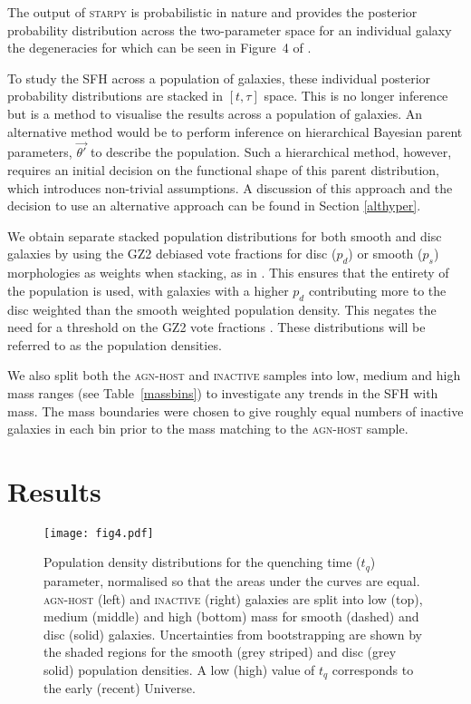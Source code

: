 \documentclass[useAMS,usenatbib]{mn2e}
\def\changed    {\color{nc} }
\def\changedbds    {\color{ncc} }
\def\secondchange    {\color{srv} }
\def\newref    {\color{new} }
\def\starpy ~{\textsc{starpy}}
\begin{document}
The output of \starpy  ~ is probabilistic in nature and provides the posterior probability distribution across the two-parameter space for an individual galaxy {\newref the degeneracies for which can be seen in Figure~4 of \citealt{Sme2015}}. {\changed To study the SFH across a population of galaxies, these individual posterior probability distributions are {\secondchange stacked in $[t, \tau]$ space. This is no longer inference but is a method to visualise the results across a population of galaxies. An alternative method would be to perform inference on hierarchical Bayesian parent parameters, $\vec{\theta'}$ to describe the population. Such a hierarchical method, however, requires an initial decision on the functional shape of this parent distribution, which introduces non-trivial assumptions. A discussion of this approach and the decision to use an alternative approach can be found in Section \ref{althyper}.}

We obtain separate stacked population distributions for both smooth and disc galaxies by using the GZ2 debiased vote fractions for disc ($p_d$) or smooth ($p_s$) morphologies as weights when stacking, as in \citet{Sme2015}. This ensures that the entirety of the population is used, with galaxies with a higher $p_d$ contributing more to the disc weighted than the smooth weighted population density. This negates the need for a threshold on the GZ2 vote fractions \citep[e.g., $p_d > 0.8$ as used in][]{Sch2014}. {\secondchange These distributions will be referred to as the population densities.}}


We also split both the \textsc{agn-host} and \textsc{inactive} samples into low, medium and high mass ranges (see Table~\ref{massbins}) to investigate any trends in the SFH with mass. {\changed The mass boundaries were chosen to give roughly equal numbers of inactive galaxies in each bin prior to the mass matching to the \textsc{agn-host} sample.} 


\section{Results}

\begin{figure*}
\texttt{[image: fig4.pdf]}
\caption{{\secondchange Population density} distributions for the quenching time ($t_q$) parameter, {\changedbds normalised so that the areas under the curves are equal}. \textsc{agn-host} (left) and \textsc{inactive} (right) galaxies are split into low (top), medium (middle) and high (bottom) mass for smooth (dashed) and disc (solid) galaxies. {\newref Uncertainties from bootstrapping are shown by the shaded regions for the smooth (grey striped) and disc (grey solid) population densities.} A low (high) value of $t_q$ corresponds to the early (recent) Universe.}
\label{time}
\end{figure*}
\end{document}
